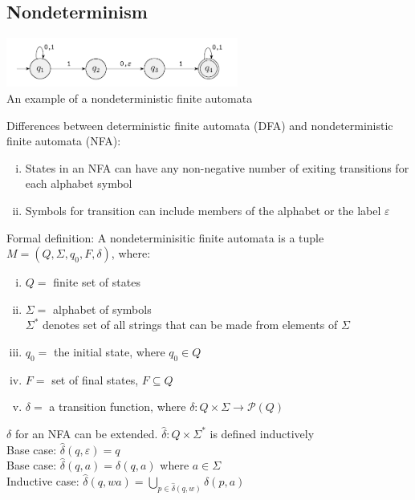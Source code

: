 \documentclass{article}
\newcommand*{\<}{\langle}
\renewcommand*{\>}{\rangle}
\begin{document}
		\subsection{Nondeterminism}
			\begin{center}
				\includegraphics[width = 3.0in]{nfa.png} \\
				An example of a nondeterministic finite automata \\
				\end{center}
			Differences between deterministic finite automata (DFA) and nondeterministic finite automata (NFA):
			\begin{enumerate}[(i)]
				\item States in an NFA can have any non-negative number of exiting transitions for each alphabet symbol
				\item Symbols for transition can include members of the alphabet or the label $\varepsilon$
				\end{enumerate}
			Formal definition: A nondeterminisitic finite automata is a tuple $M = (Q, \Sigma, q_0, F, \delta)$, where:
			\begin{enumerate}[(i)]
				\item $Q = $ finite set of states
				\item $\Sigma = $ alphabet of symbols \\
				$\Sigma^*$ denotes set of all strings that can be made from elements of $\Sigma$ 
				\item $q_0 = $ the initial state, where $q_0 \in Q$ 
				\item $F = $ set of final states, $F \subseteq Q$ 
				\item $\delta = $ a transition function, where $\delta : Q \times \Sigma \to \mathcal{P}(Q)$
				\end{enumerate}
			$\delta$ for an NFA can be extended. $\hat{\delta} : Q \times \Sigma^*$ is defined inductively\\
			Base case: $\hat{\delta}(q, \varepsilon) = {q}$ \\
			Base case: $\hat{\delta}(q, a) = \delta(q, a)$ where $a \in \Sigma$ \\
			Inductive case: $\hat{\delta}(q, wa) = \bigcup\limits_{p \in \hat{\delta}(q, w)}\delta(p, a)$ \\
			\\
\end{document}
